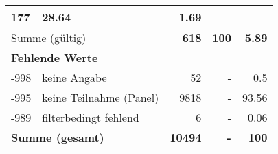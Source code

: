 \begin{longtable}{lXrrr}
       \num{177} &
       \num[round-mode=places,round-precision=2]{28,64} &
         \num[round-mode=places,round-precision=2]{1,69} \\
     \midrule
     \multicolumn{2}{l}{Summe (gültig)} &
       \textbf{\num{618}} &
     \textbf{100} &
       \textbf{\num[round-mode=places,round-precision=2]{5,89}} \\
     \multicolumn{5}{l}{\textbf{Fehlende Werte}}\\
       -998 &
       keine Angabe &
         \num{52} &
        - &
         \num[round-mode=places,round-precision=2]{0,5} \\
       -995 &
       keine Teilnahme (Panel) &
         \num{9818} &
        - &
         \num[round-mode=places,round-precision=2]{93,56} \\
       -989 &
       filterbedingt fehlend &
         \num{6} &
        - &
         \num[round-mode=places,round-precision=2]{0,06} \\
     \midrule
     \multicolumn{2}{l}{\textbf{Summe (gesamt)}} &
          \textbf{\num{10494}} &
        \textbf{-} &
        \textbf{100} \\
     \bottomrule
     \end{longtable}
     

